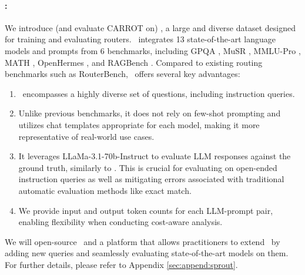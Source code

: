 \paragraph{\newdata:} We introduce (and evaluate CARROT on) \newdata, a large and diverse dataset designed for training and evaluating routers. \newdata\ integrates 13 state-of-the-art language models and prompts from 6 benchmarks, including GPQA \citep{rein2023gpqagraduatelevelgoogleproofqa}, MuSR \citep{sprague2024musrtestinglimitschainofthought}, MMLU-Pro \citep{wang2024mmluprorobustchallengingmultitask}, MATH \citep{hendrycks2021measuringmathematicalproblemsolving}, OpenHermes \citep{teknium_openhermes_2.5}, and RAGBench \citep{friel2025ragbenchexplainablebenchmarkretrievalaugmented}. Compared to existing routing benchmarks such as RouterBench, \newdata\ offers several key advantages: 
\begin{enumerate}
    \item \newdata\ encompasses a highly diverse set of questions, including instruction queries.
    \item Unlike previous benchmarks, it does not rely on few-shot prompting and utilizes chat templates appropriate for each model, making it more representative of real-world use cases.
    \item It leverages LLaMa-3.1-70b-Instruct \citep{grattafiori2024llama3herdmodels} to evaluate LLM responses against the ground truth, similarly to \citet{ni2024mixeval}. This is crucial for evaluating on open-ended instruction queries as well as mitigating errors associated with traditional automatic evaluation methods like exact match.
    \item We provide input and output token counts for each LLM-prompt pair, enabling flexibility when conducting cost-aware analysis.
\end{enumerate}
We will open-source \newdata\ and a platform that allows practitioners to extend \newdata\ by adding new queries and seamlessly evaluating state-of-the-art models on them. For further details, please refer to Appendix \ref{sec:append:sprout}.




